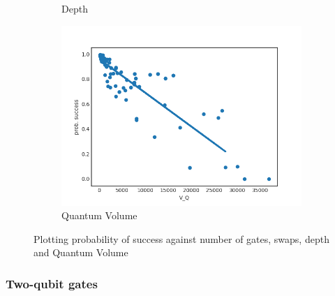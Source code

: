 \documentclass[11pt]{article}
\begin{document}
\begin{figure}[H]
\begin{subfigure}[b]{0.5\linewidth}
    \caption{Depth} 
    \label{fig:ps_d_3000} 
  \end{subfigure}%
  \begin{subfigure}[b]{0.5\linewidth}
    \centering
    \includegraphics[width=0.75\linewidth]{ps_q_3000_0_005} 
    \caption{Quantum Volume} 
    \label{fig:ps_q_3000} 
  \end{subfigure} 
  \caption{Plotting probability of success against number of gates, swaps, depth and Quantum Volume}
  \label{fig:ps_3000} 
\end{figure}




\subsubsection{Two-qubit gates}
\label{sec:org0844baf}
\end{document}
